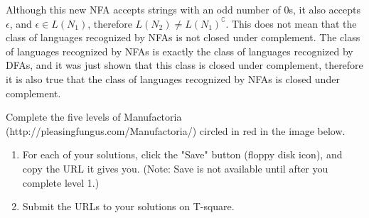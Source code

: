 \documentclass[10pt, legalpaper]{exam}
\begin{document}
\begin{questions}
\begin{enumerate}[(a)]
\begin{center}
    \end{center}
    
    Although this new NFA accepts strings with an odd number of 0s, it also accepts \(\epsilon\), and \(\epsilon \in L(N_{1})\), therefore \(L(N_{2}) \neq L(N_{1})^{\complement}\). This does not mean that the class of languages recognized by NFAs is not closed under complement. The class of languages recognized by NFAs is exactly the class of languages recognized by DFAs, and it was just shown that this class is closed under complement, therefore it is also true that the class of languages recognized by NFAs is closed under complement.
\end{enumerate}

\newpage
\addpoints
\question[25] Complete the five levels of Manufactoria (http://pleasingfungus.com/Manufactoria/) circled in red in the image below.
\begin{enumerate}
\item For each of your solutions, click the "Save" button (floppy disk icon), and copy the URL it gives you. (Note: Save is not available until after you complete level 1.)

\item Submit the URLs to your solutions on T-square.


\end{enumerate}
\end{questions}
\end{document}
